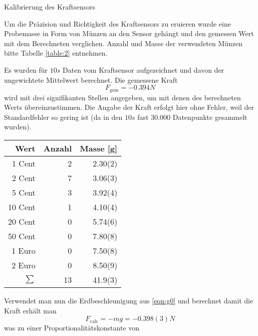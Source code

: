 \documentclass{alex_gp}
\begin{document}
\begin{mybox}{Kalibrierung des Kraftsensors}
	\begin{vwcol}[widths={0.6,0.4}, sep=.8cm, justify=flush,rule=0pt, indent=1em, lines=21] 
		Um die Präzision und Richtigkeit des Kraftsensors zu eruieren wurde eine Probemasse in Form von Münzen an den Sensor gehängt und den gemessen Wert mit dem Berechneten verglichen. Anzahl und Masse der verwendeten Münzen bitte Tabelle \ref{table:2} entnehmen.
		
		Es wurden für \( 10 \unit{s} \) Daten vom  Kraftsensor aufgezeichnet und davon der ungewichtete Mittelwert berechnet. Die gemessene Kraft 
		\begin{equation}\label{eqn:Fgem}
			F_{\text{gem}} = -0.394 \unit{N}
		\end{equation}
		wird mit drei signifikanten Stellen angegeben, um mit denen des berechneten Werts übereinzustimmen.
		Die Angabe der Kraft erfolgt hier ohne Fehler, weil der Standardfehler so gering ist (da in den \( 10 \unit{s} \) fast 30.000 Datenpunkte gesammelt wurden).
		\newpage
		\begin{minipage}[t][1cm][t]{0.35\textwidth}
			\begin{tabular}{@{} rrr @{}}\toprule
				Wert & Anzahl & Masse [g] \\ \midrule
				1 Cent & 2 & 2.30(2) \\
				2 Cent & 7 & 3.06(3) \\
				5 Cent & 3 & 3.92(4) \\
				10 Cent & 1 & 4.10(4) \\
				20 Cent & 0 & 5.74(6) \\
				50 Cent & 0 & 7.80(8) \\
				1 Euro & 0 & 7.50(8) \\
				2 Euro & 0 & 8.50(9) \\
				\midrule
				\( \sum \) & 13 & 41.9(3) \\
				\bottomrule
			\end{tabular}
			\label{table:2}
		\end{minipage}
	\end{vwcol}
	\vspace{-2cm}\noindent
	Verwendet man nun die Erdbeschleunigung aus \ref{eqn:g0} und berechnet damit die Kraft erhält man
	\begin{equation}\label{eqn:Ferr}
		F_{\text{calc}} = -mg = -0.398(3) \unit{N}
	\end{equation}
	was zu einer Proportionalitätskonstante von 

\end{mybox}
\end{document}
